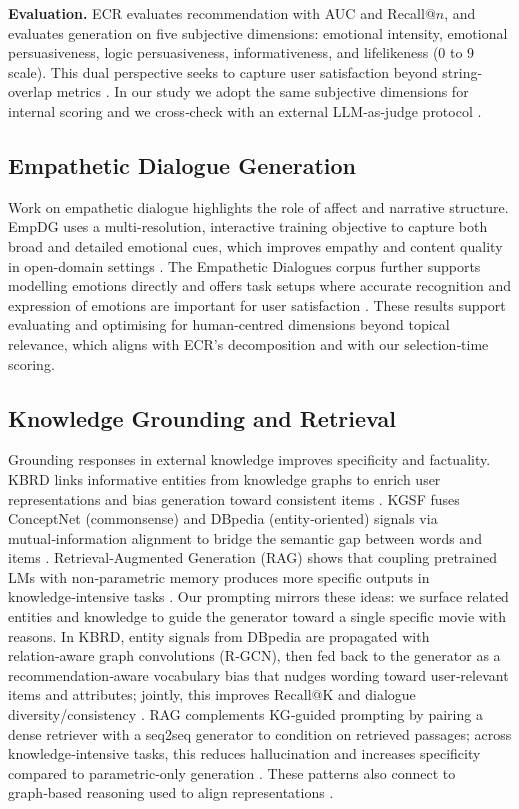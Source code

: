 \documentclass[12pt]{article}
\begin{document}
  \textbf{Evaluation.} ECR evaluates recommendation with AUC and Recall@\(n\), and evaluates generation on five subjective dimensions: emotional intensity, emotional persuasiveness, logic persuasiveness, informativeness, and lifelikeness (0 to 9 scale). This dual perspective seeks to capture user satisfaction beyond string-overlap metrics \citep{zhang2024ecr}. In our study we adopt the same subjective dimensions for internal scoring and we cross‑check with an external LLM‑as‑judge protocol \citep{yan2023llmjudge}.

  
  \subsection{Empathetic Dialogue Generation}
  Work on empathetic dialogue highlights the role of affect and narrative structure. EmpDG uses a multi-resolution, interactive training objective to capture both broad and detailed emotional cues, which improves empathy and content quality in open-domain settings \citep{li2020empdg}. The Empathetic Dialogues corpus further supports modelling emotions directly and offers task setups where accurate recognition and expression of emotions are important for user satisfaction \citep{rashkin2019empathetic}. These results support evaluating and optimising for human‑centred dimensions beyond topical relevance, which aligns with ECR's decomposition and with our selection‑time scoring.
  
  \subsection{Knowledge Grounding and Retrieval}
  Grounding responses in external knowledge improves specificity and factuality. KBRD links informative entities from knowledge graphs to enrich user representations and bias generation toward consistent items \citep{chen2020kbrd}. KGSF fuses ConceptNet (commonsense) and DBpedia (entity‑oriented) signals via mutual‑information alignment to bridge the semantic gap between words and items \citep{zhou2020kgsf,speer2017conceptnet,dbpedia_wikipedia}. Retrieval‑Augmented Generation (RAG) shows that coupling pretrained LMs with non‑parametric memory produces more specific outputs in knowledge‑intensive tasks \citep{lewis2020rag}. Our prompting mirrors these ideas: we surface related entities and knowledge to guide the generator toward a single specific movie with reasons.
  In KBRD, entity signals from DBpedia are propagated with relation‑aware graph convolutions (R‑GCN), then fed back to the generator as a recommendation‑aware vocabulary bias that nudges wording toward user‑relevant items and attributes; jointly, this improves Recall@K and dialogue diversity/consistency \citep{chen2020kbrd}. RAG complements KG‑guided prompting by pairing a dense retriever with a seq2seq generator to condition on retrieved passages; across knowledge‑intensive tasks, this reduces hallucination and increases specificity compared to parametric‑only generation \citep{lewis2020rag}. These patterns also connect to graph‑based reasoning used to align representations \citep{velickovic2018deep}.
  
\end{document}
